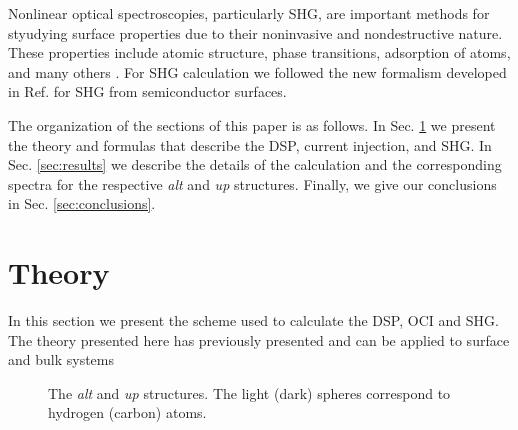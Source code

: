 \documentclass[pss]{wiley2sp} %
\begin{document}

Nonlinear optical spectroscopies, particularly SHG, are important methods for
styudying surface properties due to their noninvasive and nondestructive
nature. These properties include atomic structure, phase transitions,
adsorption of atoms, and many others \cite{dadap1997second,%
daum1993identification,mcgilp1994probing,power1995resonant,%
godefroy1996electric,salazar2014molecular,chen1981surface,%
mendoza1998microscopic}. For SHG calculation we followed
the new formalism developed in Ref. \cite{anderson2015theory} for SHG from
semiconductor surfaces.

The organization of the sections of this paper is as follows. In Sec.
\ref{sec:theory} we present the theory and formulas that describe the DSP,
current injection, and SHG. In Sec. \ref{sec:results} we describe the details
of the calculation and the corresponding spectra for the respective \emph{alt}
and \emph{up} structures. Finally, we give our conclusions in Sec.
\ref{sec:conclusions}.


\section{Theory}\label{sec:theory}

\begin{changed}
In this section we present the scheme used to calculate the DSP, OCI and SHG. The theory presented here has previously presented and can be applied to surface and bulk systems \cite{nastos2007full,mendoza2012optical,cabellos2011optical,sipe2000second,andersonPRB15}
\end{changed}

\begin{figure}[t]
\hfill
{}
\caption{The \emph{alt} and \emph{up} structures. The light
(dark) spheres correspond to hydrogen (carbon) atoms.\label{fig:structures}}
\end{figure}
\end{document}
